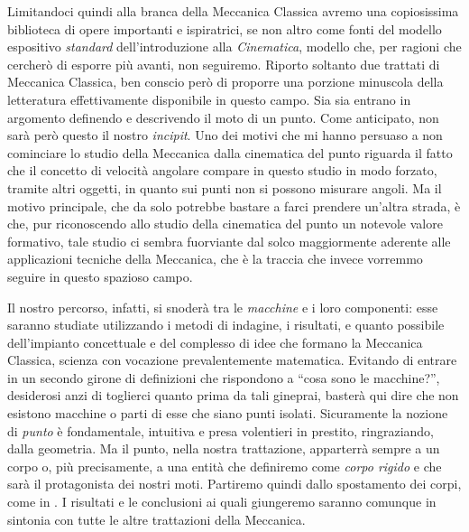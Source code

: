 \noindent Limitandoci quindi alla branca della Meccanica Classica avremo una copiosissima
biblioteca di opere importanti e ispiratrici, se non altro come fonti del
modello espositivo {\em standard} dell'introduzione alla {\em Cinematica},
modello che, per ragioni che cercher\`o di esporre
pi\`u avanti, non seguiremo.
\noindent Riporto soltanto due trattati di Meccanica Classica, 
ben conscio per\`o di proporre
una  porzione minuscola della letteratura effettivamente disponibile in questo campo. 
Sia \cite{goldstein} sia \cite{levicivita} entrano in argomento definendo e descrivendo il
moto di un punto. Come anticipato, non sar\`a per\`o questo il nostro {\em incipit}. Uno 
dei motivi che mi hanno persuaso a non cominciare lo studio della Meccanica
dalla cinematica del punto riguarda il fatto
che il concetto di velocit\`a angolare compare in questo studio in
modo forzato, tramite
altri oggetti, in quanto sui punti non si possono misurare angoli. Ma il motivo 
principale, che da solo potrebbe bastare a farci prendere un'altra strada, \`e che,
pur riconoscendo allo studio della cinematica del punto un notevole valore
formativo, tale studio ci sembra fuorviante dal solco maggiormente
 aderente alle applicazioni
tecniche della Meccanica, che \`e la traccia che invece
vorremmo seguire in questo spazioso campo.

\noindent Il nostro percorso, infatti, si snoder\`a tra le {\em macchine} e i loro componenti: esse saranno studiate
utilizzando i metodi di indagine, i risultati, e quanto possibile dell'impianto
concettuale e del complesso di idee che formano la Meccanica Classica,
scienza con vocazione prevalentemente matematica. Evitando
di entrare in un secondo girone di definizioni che rispondono a ``cosa sono le macchine?'',
desiderosi anzi di toglierci quanto prima da tali gineprai,
baster\`a qui dire che non esistono macchine o parti di esse che siano punti isolati.
Sicuramente la nozione di {\em punto} \`e fondamentale, intuitiva e presa volentieri
in prestito, ringraziando, dalla geometria. Ma il punto, nella nostra trattazione,
apparterr\`a sempre a un corpo o, pi\`u precisamente, a una entit\`a
che definiremo come {\em corpo rigido}
 e che sar\`a il protagonista dei nostri moti. Partiremo quindi
dallo spostamento dei corpi, come in \cite{whittaker}. I risultati e le conclusioni
ai quali giungeremo saranno comunque in sintonia
con tutte le altre trattazioni della Meccanica.


